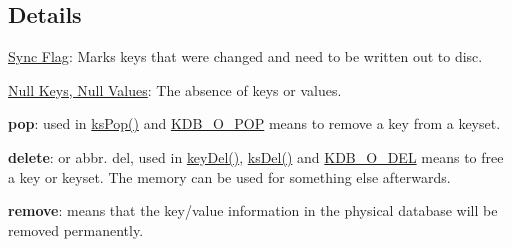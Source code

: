 \subsection*{Details}


\begin{DoxyItemize}
\item \hyperlink{doc_help_elektra-sync-flag_md}{Sync Flag}\+: Marks keys that were changed and need to be written out to disc.
\item \hyperlink{md_doc_help_elektra-values_doc_help_elektra-values_md}{Null Keys, Null Values}\+: The absence of keys or values.
\item {\bfseries pop}\+: used in \hyperlink{group__keyset_gae42530b04defb772059de0600159cf69}{ks\+Pop()} and \hyperlink{group__keyset_gga98a3d6a4016c9dad9cbd1a99a9c2a45aa52fb5f2cc86773d393da62bebebf7984}{K\+D\+B\+\_\+\+O\+\_\+\+P\+O\+P} means to remove a key from a keyset.
\item {\bfseries delete}\+: or abbr. del, used in \hyperlink{group__key_ga3df95bbc2494e3e6703ece5639be5bb1}{key\+Del()}, \hyperlink{group__keyset_ga27e5c16473b02a422238c8d970db7ac8}{ks\+Del()} and \hyperlink{group__keyset_gga98a3d6a4016c9dad9cbd1a99a9c2a45aa66a5380c120f25f28f49848c4a863ead}{K\+D\+B\+\_\+\+O\+\_\+\+D\+E\+L} means to free a key or keyset. The memory can be used for something else afterwards.
\item {\bfseries remove}\+: means that the key/value information in the physical database will be removed permanently. 
\end{DoxyItemize}